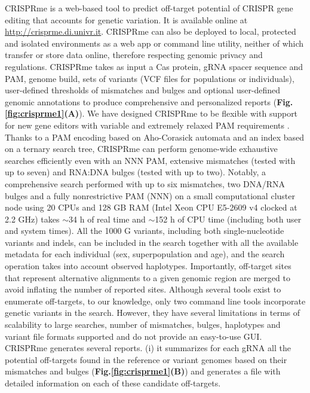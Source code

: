 \documentclass[a4paper, titlepage, openright]{book}
\newcommand{\crisprme}{CRISPRme\xspace}
\begin{document}
\crisprme is a web-based tool to predict off-target potential of CRISPR gene editing that accounts for genetic variation. It is available online at \url{http://crisprme.di.univr.it}. \crisprme can also be deployed to local, protected and isolated environments as a web app or command line utility, neither of which transfer or store data online, therefore respecting genomic privacy and regulations. \crisprme takes as input a Cas protein, gRNA spacer sequence and PAM, genome build, sets of variants (VCF files for populations or individuals), user-defined thresholds of mismatches and bulges and optional user-defined genomic annotations to produce comprehensive and personalized reports (\textbf{Fig.\ref{fig:crisprme1}(A)}). We have designed CRISPRme to be flexible with support for new gene editors with variable and extremely relaxed PAM requirements \citep{walton2020unconstrained}. Thanks to a PAM encoding based on Aho-Corasick automata and an index based on a ternary search tree, CRISPRme can perform genome-wide exhaustive searches efficiently even with an NNN PAM, extensive mismatches (tested with up to seven) and RNA:DNA bulges (tested with up to two). Notably, a comprehensive search performed with up to six mismatches, two DNA/RNA bulges and a fully nonrestrictive PAM (NNN) on a small computational cluster node using 20 CPUs and 128 GB RAM (Intel Xeon CPU E5-2609 v4 clocked at 2.2 GHz) takes $\sim$34 h of real time and $\sim$152 h of CPU time (including both user and system times). All the 1000 G variants, including both single-nucleotide variants and indels, can be included in the search together with all the available metadata for each individual (sex, superpopulation and age), and the search operation takes into account observed haplotypes. Importantly, off-target sites that represent alternative alignments to a given genomic region are merged to avoid inflating the number of reported sites. Although several tools exist to enumerate off-targets, to our knowledge, only two command line tools \citep{lessard2017human, fennell2021calitas} incorporate genetic variants in the search. However, they have several limitations in terms of scalability to large searches, number of mismatches, bulges, haplotypes and variant file formats supported and do not provide an easy-to-use GUI. \crisprme generates several reports. (i) it summarizes for each gRNA all the potential off-targets found in the reference or variant genomes based on their mismatches and bulges (\textbf{Fig.\ref{fig:crisprme1}(B)}) and generates a file with detailed information on each of these candidate off-targets. 
\end{document}
